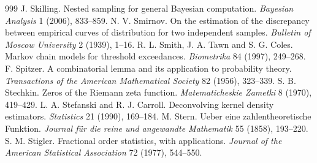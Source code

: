 \begin{thebibliography}{999}
 J. Skilling. Nested sampling for general Bayesian computation. \emph{Bayesian Analysis} 1 (2006), 833--859.
 N. V. Smirnov. On the estimation of the discrepancy between empirical curves of distribution for two independent samples. \emph{Bulletin of Moscow University} 2 (1939), 1--16. %
 R. L. Smith, J. A. Tawn and S. G. Coles. Markov chain models for threshold exceedances. \emph{Biometrika} 84 (1997), 249--268.
 F. Spitzer. A combinatorial lemma and its application to probability theory. \emph{Transactions of the American Mathematical Society} 82 (1956), 323--339.
 S. B. Stechkin. Zeros of the Riemann zeta function. \emph{Matematicheskie Zametki} 8 (1970), 419--429.
 L. A. Stefanski and R. J. Carroll. Deconvolving kernel density estimators. \emph{Statistics} 21 (1990), 169--184.
 M. Stern. Ueber eine zahlentheoretische Funktion. \emph{Journal f\"ur die reine und angewandte Mathematik} 55 (1858), 193--220.
 S. M. Stigler. Fractional order statistics, with applications. \emph{Journal of the American Statistical Association} 72 (1977), 544--550.

\end{thebibliography}
